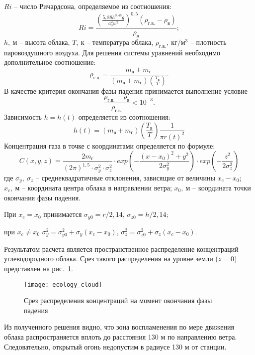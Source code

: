 $Ri$ – число Ричардсона, определяемое из соотношения:
$$
Ri = \frac{
\left(
\frac{
5,88h^{0,48}g
}{
a_3^2 w^2
}
\right)^{0,5}
(\rho_{г.в.} - \rho_в)
}{\rho_в};
$$
$h, \ м$ – высота облака, $T, \ к$ – температура облака, $\rho_{г.в.}, \ кг/м^3$ – плотность паровоздушного воздуха.
Для решения системы уравнений необходимо дополнительное соотношение:
$$
\rho_{г.в.} = \frac{
m_в + m_г
}{
\left(
m_в + m_г
\right)
\left(
\frac{T_в}{T}
\right)
}.
$$
В качестве критерия окончания фазы падения принимается выполнение условие
$$
\frac{\rho_{г.в.} - \rho_в}{\rho_{г.в.}} < 10^{-3}.
$$
Зависимость $h=h(t)$ определяется из соотношения:
$$
h(t) = \left(
m_в + m_г
\right)
\left(
\frac{T_в}{T}
\right)
\frac{
1
}{
\pi r(t)^2
}
$$
Концентрация газа в точке с координатами  определяется по формуле:
$$
C(x, y, z) = \frac{
2m_г
}{
(2\pi)^{1,5} \cdot \sigma_y^2 \cdot \sigma_z^2
} \cdot
exp\left(
-\frac{
(x - x_0)^2 + y^2
}{
2\sigma_y^2
}
\right) \cdot
exp\left(
-\frac{
z^2
}{
2\sigma_z^2
}
\right)
$$
где $\sigma_y, \ \sigma_z$ – среднеквадратичные отклонения, зависящие от величины $x_c - x_0$; $x_c, \ м$ – координата центра облака в направлении ветра; $x_0, \ м$ – координата точки окончания фазы падения.

При $x_c = x_0$ принимается $\sigma_{y0}=r/2,14$, $\sigma_{z0}=h/2,14$;

при $x_c \neq x_0$ $\sigma_y^2 = \sigma_{y0}^2 + \sigma_y(x_c - x_0)$, $\sigma_z^2 = \sigma_{z0}^2 + \sigma_z(x_c - x_0)$.

Результатом расчета является пространственное распределение концентраций углеводородного облака. Срез такого
распределения на уровне земли ($z=0$) представлен на рис.~\ref{img:ecology_cloud}.

\begin{figure}[H]
	\centering
	\texttt{[image: ecology\_cloud]}
	\caption{Срез распределения концентраций на момент окончания фазы падения}
	\label{img:ecology_cloud}
\end{figure}

Из полученного решения видно, что зона воспламенения по мере движения облака распространяется вплоть до расстояния 130 м по направлению ветра. Следовательно, открытый огонь недопустим в радиусе 130 м от станции.
